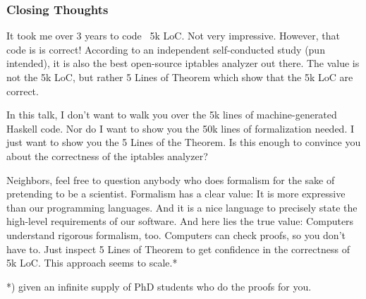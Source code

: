 \documentclass[aspectratio=169]{beamer}
\begin{document}
\begin{frame}
	\frametitle{Closing Thoughts}
	It took me over 3 years to code ~5k LoC. Not very impressive. However, that code is is correct! According to an independent self-conducted study (pun intended), it is also the best open-source iptables analyzer out there. The value is not the 5k LoC, but rather 5 Lines of Theorem which show that the 5k LoC are correct.

In this talk, I don’t want to walk you over the 5k lines of machine-generated Haskell code. Nor do I want to show you the 50k lines of formalization needed. I just want to show you the 5 Lines of the Theorem. Is this enough to convince you about the correctness of the iptables analyzer?

Neighbors, feel free to question anybody who does formalism for the sake of pretending to be a scientist. Formalism has a clear value: It is more expressive than our programming languages. And it is a nice language to precisely state the high-level requirements of our software. And here lies the true value: Computers understand rigorous formalism, too. Computers can check proofs, so you don’t have to. Just inspect 5 Lines of Theorem to get confidence in the correctness of 5k LoC. This approach seems to scale.*

*) given an infinite supply of PhD students who do the proofs for you.
\end{frame}


\backupend
\end{document}
